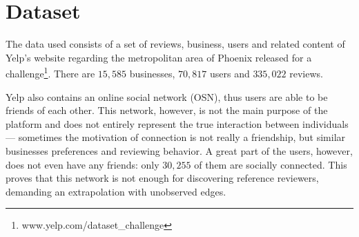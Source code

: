 \section{Dataset}
The data used consists of a set of reviews, business, users and related content
of Yelp's website regarding the metropolitan area of Phoenix released for a
challenge\footnote{www.yelp.com/dataset\_challenge}. There are $15,585$
businesses, $70,817$ users and $335,022$ reviews.

Yelp also contains an online social network (OSN), thus users are able to be
friends of each other. This network, however, is not the main purpose of the
platform and does not entirely represent the true interaction between
individuals --- sometimes the motivation of connection is not really a
friendship, but similar businesses preferences and reviewing behavior. A great
part of the users, however, does not even have any friends: only $30,255$ of
them are socially connected. This proves that this network is not enough for
discovering reference reviewers, demanding an extrapolation with unobserved
edges.
